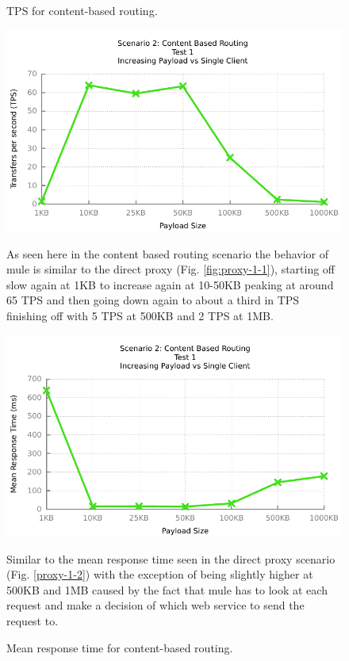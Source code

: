 \begin{figure}[H]
	\caption{TPS for content-based routing.}
	\centerline{\includegraphics{img/mediation_fu_ip_tps}}
	\label{fig:mediation-1-1}
	As seen here in the content based routing scenario the behavior of mule is similar to the direct proxy (Fig. \ref{fig:proxy-1-1}), starting off slow again at 1KB to increase again at 10-50KB peaking at around 65 TPS and then going down again to about a third in TPS finishing off with 5 TPS at 500KB and 2 TPS at 1MB.

	\caption{Mean response time for content-based routing.}
	\centerline{\includegraphics{img/mediation_fu_ip_resp}}
	\label{fig:mediation-1-2}
	Similar to the mean response time seen in the direct proxy scenario (Fig. \ref{proxy-1-2}) with the exception of being slightly higher at 500KB and 1MB caused by the fact that mule has to look at each request and make a decision of which web service to send the request to.
\end{figure}

